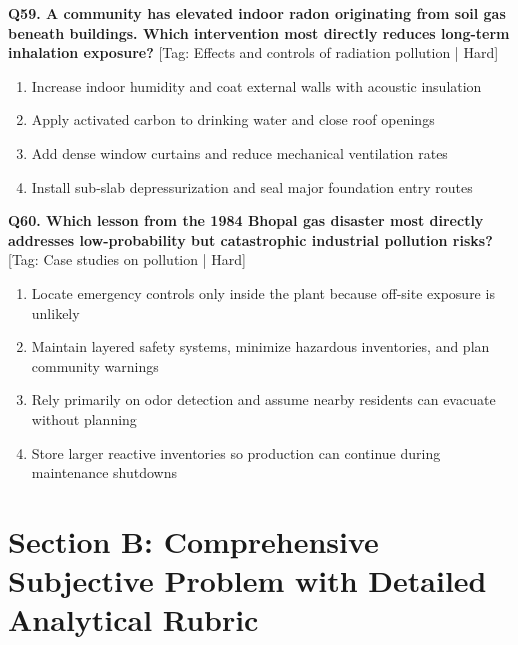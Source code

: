 \noindent\textbf{Q59. A community has elevated indoor radon originating from soil gas beneath buildings. Which intervention most directly reduces long-term inhalation exposure?} \hfill [Tag: Effects and controls of radiation pollution | Hard]
\begin{enumerate}[label=(\alph*),topsep=2pt,itemsep=1pt,partopsep=0pt,parsep=0pt]
    \item {Increase indoor humidity and coat external walls with acoustic insulation}
    \item {Apply activated carbon to drinking water and close roof openings}
    \item {Add dense window curtains and reduce mechanical ventilation rates}
    \item {Install sub-slab depressurization and seal major foundation entry routes}
\end{enumerate}
\vspace{2mm}

\noindent\textbf{Q60. Which lesson from the 1984 Bhopal gas disaster most directly addresses low-probability but catastrophic industrial pollution risks?} \hfill [Tag: Case studies on pollution | Hard]
\begin{enumerate}[label=(\alph*),topsep=2pt,itemsep=1pt,partopsep=0pt,parsep=0pt]
    \item {Locate emergency controls only inside the plant because off-site exposure is unlikely}
    \item {Maintain layered safety systems, minimize hazardous inventories, and plan community warnings}
    \item {Rely primarily on odor detection and assume nearby residents can evacuate without planning}
    \item {Store larger reactive inventories so production can continue during maintenance shutdowns}
\end{enumerate}
\vspace{2mm}


\section{Section B: Comprehensive Subjective Problem with Detailed Analytical Rubric}

